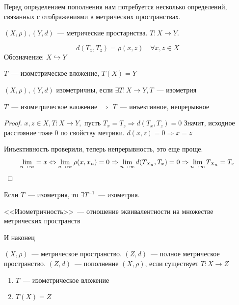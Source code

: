 \documentclass[document]{subfiles}
\begin{document}
Перед определением пополнения нам потребуется несколько определений, связанных с отображениями в метрических пространствах.

$(X, \rho), (Y, d)$~--- метрические простарнства. $T: X \rightarrow Y$.
\begin{definition}
    \[ d(T_x, T_z) = \rho(x,z) \quad \forall x,z \in X \]
Обозначение: $ X \hookrightarrow Y$
\end{definition}

\begin{definition}[Изометрия]
    $T$~--- изометрическое вложение, $T(X) = Y$
    
\end{definition}
\begin{definition}
    $(X, \rho), (Y,d)$ изометричны, если $\exists T: X \rightarrow Y, T$~--- изометрия
\end{definition}

\begin{property}
    $T$~--- изометрическое вложение $\Rightarrow$ $T$~--- инъективное, непрерывное
\end{property}
\begin{proof} 
    $x, z \in X, T: X \rightarrow Y,$ пусть $T_x = T_z \Rightarrow d(T_x, T_z) = 0$ 
    Значит, исходное расстояние тоже 0 по свойству метрики. $d(x,z) = 0 \Rightarrow x = z$

    Инъективность проверили, теперь непрерывность, это еще проще.
    \[ \lim\limits_{n \to \infty} = x \Leftrightarrow \lim\limits_{n \to \infty} \rho(x, x_n) = 0 \Rightarrow \lim\limits_{n \to \infty} d(T_{X_n}, T_x) = 0 \Rightarrow \lim\limits_{n \to \infty} T_{X_n} = T_x \]

\end{proof}

\begin{property}
    Если $T$~--- изометрия, то $\exists T^{-1}$~--- изометрия.
\end{property}

\begin{property}
    <<Изометричность>>~--- отношение эквивалентности на множестве метрических пространств
\end{property}

И наконец

\begin{definition}
    $(X, \rho)$~--- метрическое пространство. $(Z, d)$~--- полное метрическое пространство.
    $(Z,d)$~--- пополнение $(X, \rho)$, если существует $T: X \rightarrow Z$
    \begin{enumerate}
        \item $T$~--- изометрическое вложение
        \item $\overline{T(X)} = Z$
    \end{enumerate}
\end{definition}
\end{document}

